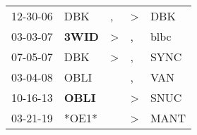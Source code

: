 \begin{supertabular}{p{0.07\textwidth}p{0.06\textwidth}p{0.02\textwidth}p{0.02\textwidth}p{0.06\textwidth}}
 12-30-06\textsuperscript{} &            DBK\textsuperscript{} &             , &  \textgreater &   DBK\textsuperscript{} \\
 03-03-07\textsuperscript{} &  \textbf{3WID\textsuperscript{}} &  \textgreater &             , &  blbc\textsuperscript{} \\
 07-05-07\textsuperscript{} &            DBK\textsuperscript{} &  \textgreater &             , &  SYNC\textsuperscript{} \\
 03-04-08\textsuperscript{} &           OBLI\textsuperscript{} &               &             , &   VAN\textsuperscript{} \\
 10-16-13\textsuperscript{} &  \textbf{OBLI\textsuperscript{}} &               &  \textgreater &  SNUC\textsuperscript{} \\
 03-21-19\textsuperscript{} &                            *OE1* &               &  \textgreater &  MANT\textsuperscript{} \\
\end{supertabular}
